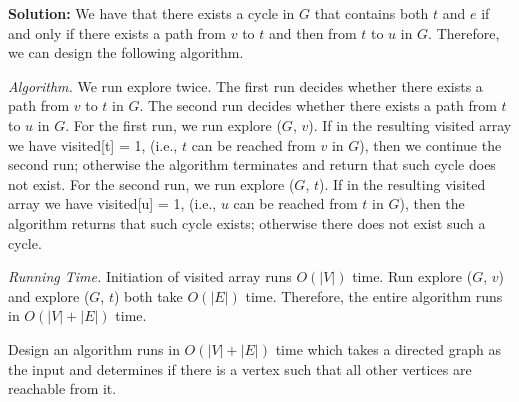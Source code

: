 \documentclass[11pt]{article}
\begin{document}
\begin{qunlist}
\textbf{Solution: }
We have that there exists a cycle in $G$ that contains both $t$ and $e$ if and only if
there exists a path from $v$ to $t$ and then from $t$ to $u$ in $G$. Therefore, we can design the following algorithm.

\emph{Algorithm.}
We run {\sf explore} twice.
The first run decides whether there exists a path from $v$ to $t$ in $G$. The
second run decides whether there exists a path from $t$ to $u$ in $G$. 
For the first run, we run {\sf explore ($G$, $v$)}. If in the resulting {\sf visited} array we have {\sf visited[t] = 1}, (i.e., $t$ can be reached
from $v$ in $G$), then we continue the second run; otherwise the algorithm terminates and return that such cycle does not exist.
For the second run, we run {\sf explore ($G$, $t$)}. 
If in the resulting {\sf visited} array we have {\sf visited[u] = 1}, (i.e., $u$ can be reached from $t$ in $G$), then 
the algorithm returns that such cycle exists; otherwise 
there does not exist such a cycle.

\emph{Running Time.} 
Initiation of visited array runs $O(|V|)$ time. Run {\sf explore ($G$, $v$)} and {\sf explore ($G$, $t$)} both take $O(|E|)$ time. Therefore, the entire algorithm runs in $O(|V| + |E|)$ time.



 Design an algorithm runs in $O(|V| + |E|)$ time which takes a directed graph as the input and determines if there is a vertex such that all other vertices are reachable from it.


\end{qunlist}
\end{document}
